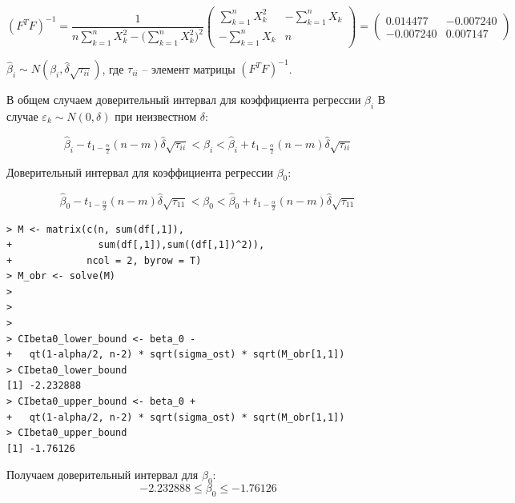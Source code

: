\documentclass[14pt,a4paper]{scrartcl}
\begin{document}
\begin{equation*}
	(F^TF)^{-1}=\frac {1}{n\sum\limits_{k=1}^nX_k^2-\Big(\sum\limits_{k=1}^nX_k^2\Big)^2}\begin{pmatrix}
	\sum\limits_{k=1}^nX_k^2& -\sum\limits_{k=1}^nX_k \\
	-\sum\limits_{k=1}^nX_k & n
	
	
	
	\end{pmatrix}=\begin{pmatrix}
	0.014477&  -0.007240 \\
	-0.007240& 0.007147
	
	
	
	\end{pmatrix}
\end{equation*}

$\hat \beta_i \sim N(\beta_i, \hat\delta \sqrt{\tau_{ii}})$, где $\tau_{ii}$ -- элемент матрицы $(F^TF)^{-1}$.


В общем случаем доверительный интервал для коэффициента регрессии $\beta_i$ В случае $\varepsilon_k \sim N(0,\delta)$ при неизвестном $\delta$:

\begin{equation*}
	\hat{\beta}_{i}-t_{1-\frac{\alpha}{2}}(n-m) \hat{\delta} \sqrt{\tau_{i i}}<\beta_{i}<\hat{\beta}_{i}+t_{1-\frac{\alpha}{2}}(n-m) \hat{\delta} \sqrt{\tau_{i i}}
\end{equation*}


Доверительный интервал для коэффициента регрессии $\beta_0$:


\begin{equation*}
	\hat{\beta}_{0}-t_{1-\frac{\alpha}{2}}(n-m) \hat{\delta} \sqrt{\tau_{11}}<\beta_{0}<\hat{\beta}_{0}+t_{1-\frac{\alpha}{2}}(n-m) \hat{\delta} \sqrt{\tau_{11}}
\end{equation*}

\begin{verbatim}
> M <- matrix(c(n, sum(df[,1]), 
+               sum(df[,1]),sum((df[,1])^2)), 
+             ncol = 2, byrow = T)
> M_obr <- solve(M)
> 
> 
> 
> CIbeta0_lower_bound <- beta_0 - 
+   qt(1-alpha/2, n-2) * sqrt(sigma_ost) * sqrt(M_obr[1,1])
> CIbeta0_lower_bound
[1] -2.232888
> CIbeta0_upper_bound <- beta_0 + 
+   qt(1-alpha/2, n-2) * sqrt(sigma_ost) * sqrt(M_obr[1,1])
> CIbeta0_upper_bound
[1] -1.76126
\end{verbatim}

Получаем доверительный интервал для $\beta_0$:
\begin{equation*}
	-2.232888 \leq \beta_0 \leq -1.76126
\end{equation*}
\end{document}
